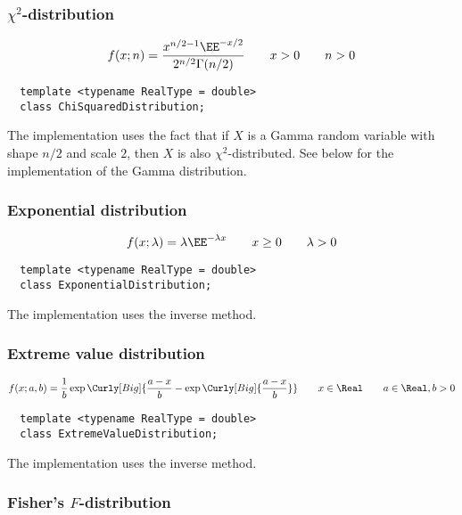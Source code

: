 \subsubsection{$\chi^2$-distribution}

\begin{equation*}
  f(x;n) = \frac{x^{n/2 - 1}\EE^{-x/2}}{2^{n/2}\Gamma(n/2)}
  \qquad x > 0
  \qquad n > 0
\end{equation*}
\begin{Verbatim}
  template <typename RealType = double>
  class ChiSquaredDistribution;
\end{Verbatim}
The implementation uses the fact that if $X$ is a Gamma random variable with
shape $n / 2$ and scale $2$, then $X$ is also $\chi^2$-distributed. See below
for the implementation of the Gamma distribution.

\subsubsection{Exponential distribution}

\begin{equation*}
  f(x;\lambda) = \lambda\EE^{-\lambda x}
  \qquad x \ge 0
  \qquad \lambda > 0
\end{equation*}
\begin{Verbatim}
  template <typename RealType = double>
  class ExponentialDistribution;
\end{Verbatim}
The implementation uses the inverse method.

\subsubsection{Extreme value distribution}

\begin{equation*}
  f(x;a,b) = \frac{1}{b}
  \exp\Curly[Big]{\frac{a - x}{b} - \exp\Curly[Big]{\frac{a - x}{b}}}
  \qquad x \in \Real
  \qquad a \in \Real, b > 0
\end{equation*}
\begin{Verbatim}
  template <typename RealType = double>
  class ExtremeValueDistribution;
\end{Verbatim}
The implementation uses the inverse method.

\subsubsection{Fisher's $F$-distribution}

